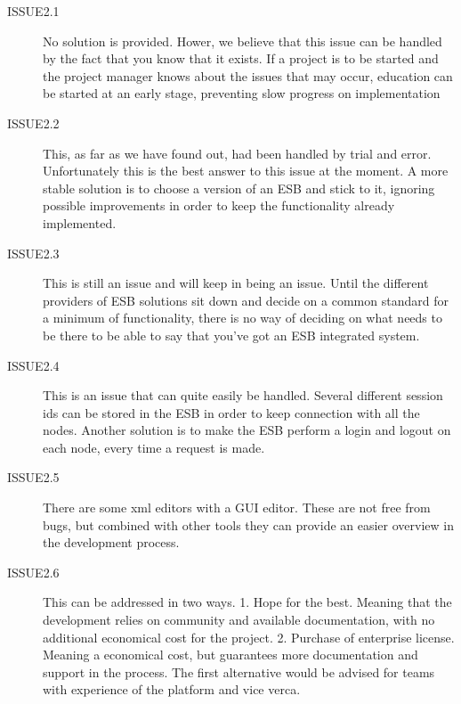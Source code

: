 \documentclass{llncs}
\begin{document}
\begin{description}
\begin{description}
\item[ISSUE2.1] No solution is provided. Hower, we believe that this issue can be handled by the fact that you know that it exists. If a project is to be started and the project manager knows about the issues that may occur, education can be started at an early stage, preventing slow progress on implementation
\item[ISSUE2.2] This, as far as we have found out, had been handled by trial and error. Unfortunately this is the best answer to this issue at the moment. A more stable solution is to choose a version of an ESB and stick to it, ignoring possible improvements in order to keep the functionality already implemented.
\item[ISSUE2.3] This is still an issue and will keep in being an issue. Until the different providers of ESB solutions sit down and decide on a common standard for a minimum of functionality, there is no way of deciding on what needs to be there to be able to say that you’ve got an ESB integrated system.
\item[ISSUE2.4] This is an issue that can quite easily be handled. Several different session ids can be stored in the ESB in order to keep connection with all the nodes. Another solution is to make the ESB perform a login and logout on each node, every time  a request is made.
\item[ISSUE2.5] There are some xml editors with a GUI editor. These are not free from bugs, but combined with other tools they can provide an easier overview in the development process.
\item[ISSUE2.6] This can be addressed in two ways. 1. Hope for the best. Meaning that the development relies on community and available documentation, with no additional economical cost for the project. 2. Purchase of enterprise license. Meaning a economical cost, but guarantees more documentation and support in the process. The first alternative would be advised for teams with experience of the platform and vice verca.
\end{description}

\end{description}
\end{document}

